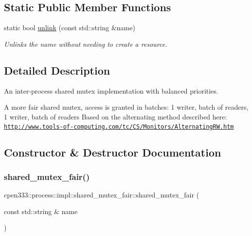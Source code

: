 \subsection*{Static Public Member Functions}
\begin{DoxyCompactItemize}
\item 
static bool \hyperlink{classcpen333_1_1process_1_1impl_1_1shared__mutex__fair_a956a4efec20df5852fef56bfd2a22ea2}{unlink} (const std\+::string \&name)
\begin{DoxyCompactList}\small\item\em Unlinks the name without needing to create a resource. \end{DoxyCompactList}\end{DoxyCompactItemize}


\subsection{Detailed Description}
An inter-\/process shared mutex implementation with balanced priorities. 

A more fair shared mutex, access is granted in batches\+: 1 writer, batch of readers, 1 writer, batch of readers Based on the alternating method described here\+: \href{http://www.tools-of-computing.com/tc/CS/Monitors/AlternatingRW.htm}{\tt http\+://www.\+tools-\/of-\/computing.\+com/tc/\+C\+S/\+Monitors/\+Alternating\+R\+W.\+htm} 

\subsection{Constructor \& Destructor Documentation}
\mbox{\label{classcpen333_1_1process_1_1impl_1_1shared__mutex__fair_a4a46bce7595b9f2a29067723f3b72b5e}} 
\subsubsection{\texorpdfstring{shared\+\_\+mutex\+\_\+fair()}{shared\_mutex\_fair()}}
{\footnotesize\ttfamily cpen333\+::process\+::impl\+::shared\+\_\+mutex\+\_\+fair\+::shared\+\_\+mutex\+\_\+fair (\begin{DoxyParamCaption}\item[{const std\+::string \&}]{name }\end{DoxyParamCaption})\hspace{0.3cm}{\ttfamily [inline]}}



